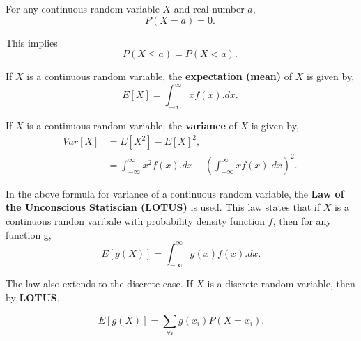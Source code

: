 \begin{prop} \label{mod2:prop:ContinuousRV:2}
	For any continuous random variable $X$ and real number $a$,
	\begin{equation}
	P(X=a) = 0.\
	\end{equation}
\end{prop}

\begin{note} 
	This implies
	\begin{equation}
	P( X \leq a) = P(X<a). \
	\end{equation}
\end{note}

\begin{defn} \label{mod2:defn:ContinuousRV:Expectation}
	If $X$ is a continuous random variable, the \textbf{expectation (mean)} of $X$ is given by,
	\begin{equation}
	E[X] = \int_{-\infty}^{\infty}x f(x).dx. \label{mod2:eq:ContinuousRV:Expectation} \
	\end{equation}
\end{defn}

\begin{defn} \label{mod2:defn:ContinuousRV:Variance}
	If $X$ is a continuous random variable, the \textbf{variance} of $X$ is given by,
	\begin{align}
	Var[X] &= E[X^2] - {E[X]}^2, \\
	 &= \int_{-\infty}^{\infty}x^2 f(x).dx - {(\int_{-\infty}^{\infty}x f(x).dx)} ^ 2. \label{mod2:eq:ContinuousRV:Variance} \
	\end{align}
\end{defn}

\begin{law} \label{mod2:law:UnconsciousStat}
	In the above formula for variance of a continuous random variable,  the \textbf{Law of the Unconscious Statiscian (LOTUS)} is used. This law states that if $X$ is a continuous randon varibale with probability density function $f$, then for any function g,
	\begin{equation}
		E[g(X)] = \int_{-\infty}^{\infty}g(x) f(x).dx. \label{mod2:eq:LOTUS:ContinuousRV}
	\end{equation}
	
	The law also extends to the discrete case. If $X$ is a discrete random variable, then by \textbf{LOTUS}, 
	
	\begin{equation}
	E[g(X)] =  \sum_{\forall i} g(x_i) P(X=x_i). \label{mod2:eq:LOTUS:DiscreteRV}
	\end{equation}
\end{law}	



